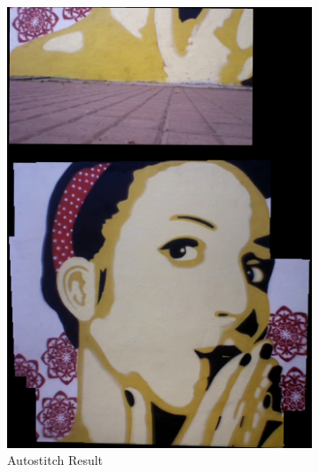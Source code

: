 \begin{figure}[t!]
\centering
\begin{subfigure}[b]{0.4\textwidth}
\centering
\includegraphics[width=\linewidth]{figures/sac3/uniform_sampled/autostitch.jpg}
\caption{Autostitch Result}
\end{subfigure}
\begin{subfigure}[b]{0.4\textwidth}
\centering

\end{subfigure}
\end{figure}
